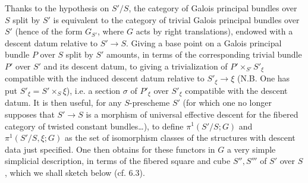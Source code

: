 Thanks to the hypothesis on $S'/S$, the category of Galois principal bundles over $S$ split by $S'$ is equivalent to the category of trivial Galois principal bundles over $S'$ (hence of the form $G_{S'}$, where $G$ acts by right translations), endowed with a descent datum relative to $S'\to S$. Giving a base point on a Galois principal bundle $P$ over $S$ split by $S'$ amounts, in terms of the corresponding trivial bundle $P'$ over $S'$ and its descent datum, to giving a trivialization of $P'\times_{S'}S'_\xi$ compatible with the induced descent datum relative to $S'_\xi\to\xi$ (N.B. One has put $S'_\xi=S'\times_S\xi$), i.e. a section $\sigma$ of $P'_\xi$ over $S'_\xi$ compatible with the descent datum. It is then useful, for any $S$-prescheme $S'$ (for which one no longer supposes that $S'\to S$ is a morphism of universal effective descent for the fibered category of twisted constant bundles\dots), to define $\pi^1(S'/S;G)$ and $\pi^1(S'/S,\xi;G)$ as the set of isomorphism classes of the structures with descent data just specified. One then obtains for these functors in $G$ a very simple simplicial description, in terms of the fibered square and cube $S'',S'''$ of $S'$ over $S$, which we shall sketch below (cf. 6.3).

